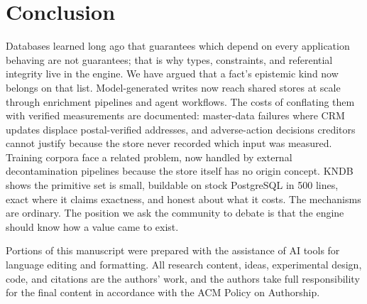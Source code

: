 \documentclass[sigconf,nonacm]{acmart}
\begin{document}
\section{Conclusion}
Databases learned long ago that guarantees which depend on every application behaving are not guarantees; that is why types, constraints, and referential integrity live in the engine. We have argued that a fact's epistemic kind now belongs on that list. Model-generated writes now reach shared stores at scale through enrichment pipelines and agent workflows. The costs of conflating them with verified measurements are documented: master-data failures where CRM updates displace postal-verified addresses, and adverse-action decisions creditors cannot justify because the store never recorded which input was measured. Training corpora face a related problem, now handled by external decontamination pipelines because the store itself has no origin concept. KNDB shows the primitive set is small, buildable on stock PostgreSQL in 500 lines, exact where it claims exactness, and honest about what it costs. The mechanisms are ordinary. The position we ask the community to debate is that the engine should know how a value came to exist.

\begin{acks}
Portions of this manuscript were prepared with the assistance of AI tools for language editing and formatting. All research content, ideas, experimental design, code, and citations are the authors' work, and the authors take full responsibility for the final content in accordance with the ACM Policy on Authorship.
\end{acks}
\end{document}
